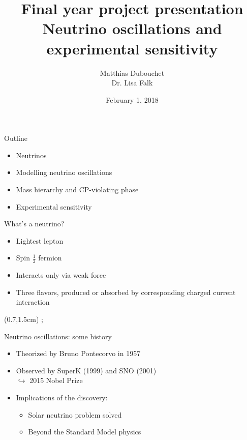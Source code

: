 \documentclass{beamer}
\title{Final year project presentation\\Neutrino
oscillations and \\experimental sensitivity}
\author{Matthias Dubouchet\\Dr. Lisa Falk}
\date{February 1, 2018}
\begin{document}
\maketitle


\begin{frame}{Outline}

	\begin{itemize}
		\item Neutrinos
		\item Modelling neutrino oscillations
		\item Mass hierarchy and CP-violating phase
		\item Experimental sensitivity
	\end{itemize}

\end{frame}


\begin{frame}{What's a neutrino?}

		\begin{itemize}
		\item Lightest lepton
		\item Spin $\frac{1}{2}$ fermion
		\item Interacts only via weak force
		\item Three flavors, produced or absorbed by corresponding charged current interaction
		\end{itemize}

	\begin{textblock*}{0.6\textwidth}(0.7\textwidth,1.5cm)
		;
	\end{textblock*}
\end{frame}


\begin{frame}{Neutrino oscillations: some history}

		\begin{itemize}
			\item Theorized by Bruno Pontecorvo in 1957
			\item Observed by SuperK (1999) and SNO
				(2001)\\\hspace{1cm}$\hookrightarrow$ 2015 Nobel Prize
			\item Implications of the discovery:
				\begin{itemize}
					\item Solar neutrino problem solved \checkmark
					\item Beyond the Standard Model physics
				\end{itemize}

		\end{itemize}

\end{frame}
\end{document}
